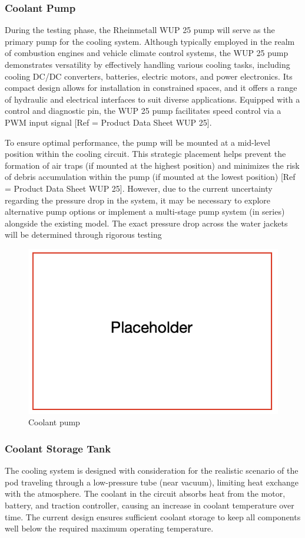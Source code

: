 \subsubsection{Coolant Pump}
During the testing phase, the Rheinmetall WUP 25 pump will serve as the primary pump for the cooling system. Although typically employed in the realm of combustion engines and vehicle climate control systems, the WUP 25 pump demonstrates versatility by effectively handling various cooling tasks, including cooling DC/DC converters, batteries, electric motors, and power electronics. Its compact design allows for installation in constrained spaces, and it offers a range of hydraulic and electrical interfaces to suit diverse applications. Equipped with a control and diagnostic pin, the WUP 25 pump facilitates speed control via a PWM input signal [Ref = Product Data Sheet WUP 25]. 

To ensure optimal performance, the pump will be mounted at a mid-level position within the cooling circuit. This strategic placement helps prevent the formation of air traps (if mounted at the highest position) and minimizes the risk of debris accumulation within the pump (if mounted at the lowest position) [Ref = Product Data Sheet WUP 25]. However, due to the current uncertainty regarding the pressure drop in the system, it may be necessary to explore alternative pump options or implement a multi-stage pump system (in series) alongside the existing model. The exact pressure drop across the water jackets will be determined through rigorous testing
\begin{figure}[ht]
  \centering
  \includegraphics[width=0.5\linewidth]{texfiles/mech/eimg/cooling/placeholder}
  \caption{Coolant pump}
  \label{fig:Coolant Pump}
\end{figure}

\subsubsection{Coolant Storage Tank}
The cooling system is designed with consideration for the realistic scenario of the pod traveling through a low-pressure tube (near vacuum), limiting heat exchange with the atmosphere. The coolant in the circuit absorbs heat from the motor, battery, and traction controller, causing an increase in coolant temperature over time. The current design ensures sufficient coolant storage to keep all components well below the required maximum operating temperature.

